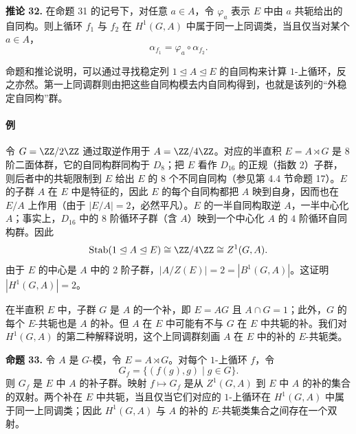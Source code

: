 \medskip
\noindent\textbf{推论 32.} 在命题 31 的记号下，对任意 $a\in A$，令 $\varphi_a$ 表示 $E$ 中由 $a$ 共轭给出的自同构。则上循环 $f_1$ 与 $f_2$ 在 $H^1(G,A)$ 中属于同一上同调类，当且仅当对某个 $a\in A$，
\[
  \alpha_{f_1}=\varphi_a\circ\alpha_{f_2}.
\]

命题和推论说明，可以通过寻找稳定列 $1\trianglelefteq A\trianglelefteq E$ 的自同构来计算 $1$-上循环，反之亦然。第一上同调群则由把这些自同构模去内自同构得到，也就是该列的“外稳定自同构”群。

\paragraph{例}
令 $G=\ZZ/2\ZZ$ 通过取逆作用于 $A=\ZZ/4\ZZ$。对应的半直积 $E=A\rtimes G$ 是 $8$ 阶二面体群，它的自同构群同构于 $D_8$；把 $E$ 看作 $D_{16}$ 的正规（指数 $2$）子群，则后者中的共轭限制到 $E$ 给出 $E$ 的 $8$ 个不同自同构（参见第 4.4 节命题 17）。$E$ 的子群 $A$ 在 $E$ 中是特征的，因此 $E$ 的每个自同构都把 $A$ 映到自身，因而也在 $E/A$ 上作用（由于 $|E/A|=2$，必然平凡）。$E$ 的一半自同构取逆 $A$，一半中心化 $A$；事实上，$D_{16}$ 中的 $8$ 阶循环子群（含 $A$）映到一个中心化 $A$ 的 $4$ 阶循环自同构群。因此
\[
  \operatorname{Stab}(1\trianglelefteq A\trianglelefteq E)\cong\ZZ/4\ZZ\cong Z^1(G,A).
\]
由于 $E$ 的中心是 $A$ 中的 $2$ 阶子群，$|A/Z(E)|=2=|B^1(G,A)|$。这证明 $|H^1(G,A)|=2$。

在半直积 $E$ 中，子群 $G$ 是 $A$ 的一个补，即 $E=AG$ 且 $A\cap G=1$；此外，$G$ 的每个 $E$-共轭也是 $A$ 的补。但 $A$ 在 $E$ 中可能有不与 $G$ 在 $E$ 中共轭的补。我们对 $H^1(G,A)$ 的第二种解释说明，这个上同调群刻画 $A$ 在 $E$ 中的补的 $E$-共轭类。

\medskip
\noindent\textbf{命题 33.} 令 $A$ 是 $G$-模，令 $E=A\rtimes G$。对每个 $1$-上循环 $f$，令
\[
  G_f=\{(f(g),g)\mid g\in G\}.
\]
则 $G_f$ 是 $E$ 中 $A$ 的补子群。映射 $f\mapsto G_f$ 是从 $Z^1(G,A)$ 到 $E$ 中 $A$ 的补的集合的双射。两个补在 $E$ 中共轭，当且仅当它们对应的 $1$-上循环在 $H^1(G,A)$ 中属于同一上同调类；因此 $H^1(G,A)$ 与 $A$ 的补的 $E$-共轭类集合之间存在一个双射。

